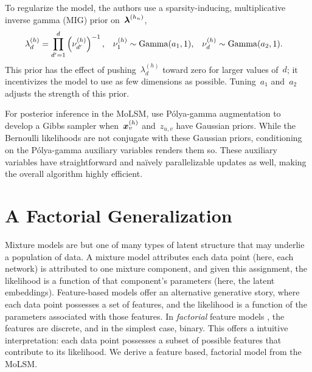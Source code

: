 To regularize the model, the authors use a sparsity-inducing, multiplicative
inverse gamma (MIG) prior on~$\boldsymbol{\lambda}^{(h_n)}$,
\begin{align}
  \lambda_d^{(h)} &= \prod_{d'=1}^d \left(\nu_{d'}^{(h)} \right)^{-1}, &
  \nu_1^{(h)} &\sim \mathrm{Gamma}(a_1, 1), &
  \nu_d^{(h)} &\sim \mathrm{Gamma}(a_2, 1).
\end{align}
This prior has the effect of pushing~$\lambda_d^{(h)}$ toward zero
for larger values of~$d$; it incentivizes the model to use
as few dimensions as possible. Tuning~$a_1$ and~$a_2$ adjusts
the strength of this prior.

For posterior inference in the MoLSM, \citet{durante2016nonparametric} use
P\'{o}lya-gamma augmentation to develop a Gibbs sampler 
when~$\boldsymbol{x}_v^{(h)}$ and~$z_{u,v}$ have Gaussian priors. 
While the Bernoulli likelihoods are not conjugate with these Gaussian
priors, conditioning on the P\'{o}lya-gamma auxiliary variables renders them so.
These auxiliary variables have straightforward and na\"{i}vely parallelizable
updates as well, making the overall algorithm highly efficient.

\section{A Factorial Generalization}
Mixture models are but one of many types of latent structure that may
underlie a population of data.  A mixture model attributes each data point
(here, each network) is attributed to one mixture component, and given
this assignment, the likelihood is a function of that component's
parameters (here, the latent embeddings).  Feature-based models offer
an alternative generative story, where each data point possesses a
set of features, and the likelihood is a function of the parameters
associated with those features.  In \emph{factorial} feature models
\citep{ghahramani1995factorial, ghahramani1996factorial,
  meeds2007modeling, ghahramani2007bayesian, miller2009nonparametric}, the features are
discrete, and in the simplest case, binary.  This offers a intuitive
interpretation: each data point possesses a subset of possible features
that contribute to its likelihood.  We derive a feature
based, factorial model from the MoLSM.

